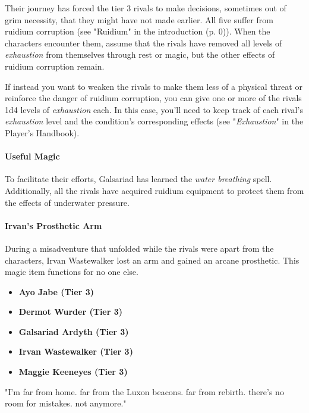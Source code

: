\documentclass[a4paper, 11pt, bg=full, twocolumn, nooutline]{dndbook}
\begin{document}
Their journey has forced the tier 3 rivals to make decisions, sometimes out of grim necessity, that they might have not made earlier. All five suffer from ruidium corruption (see "Ruidium" in the introduction (p. 0)). When the characters encounter them, assume that the rivals have removed all levels of \textit{exhaustion} from themselves through rest or magic, but the other effects of ruidium corruption remain.


If instead you want to weaken the rivals to make them less of a physical threat or reinforce the danger of ruidium corruption, you can give one or more of the rivals 1d4 levels of \textit{exhaustion} each. In this case, you'll need to keep track of each rival's \textit{exhaustion} level and the condition's corresponding effects (see "\textit{Exhaustion}" in the Player's Handbook).

\paragraph{Useful Magic}

To facilitate their efforts, Galsariad has learned the \textit{water breathing} spell. Additionally, all the rivals have acquired ruidium equipment to protect them from the effects of underwater pressure.

\paragraph{Irvan's Prosthetic Arm}

During a misadventure that unfolded while the rivals were apart from the characters, Irvan Wastewalker lost an arm and gained an arcane prosthetic. This magic item functions for no one else.

\begin{itemize}
\item \textbf{Ayo Jabe (Tier 3)}
\item \textbf{Dermot Wurder (Tier 3)}
\item \textbf{Galsariad Ardyth (Tier 3)}
\item \textbf{Irvan Wastewalker (Tier 3)}
\item \textbf{Maggie Keeneyes (Tier 3)}
\end{itemize}

\begin{DndReadAloud}
"I'm far from home. far from the Luxon beacons. far from rebirth. there's no room for mistakes. not anymore."
\end{DndReadAloud}
\end{document}
